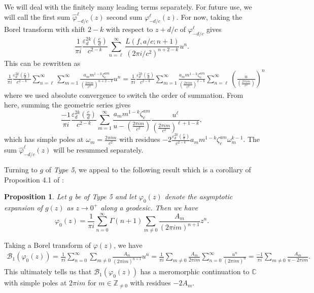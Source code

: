 \documentclass[12pt]{amsart}
\theoremstyle{definition}
\theoremstyle{plain}
\newtheorem{prop}[theorem]{Proposition}
\numberwithin{equation}{section}
\begin{document}
We will deal with the finitely many leading terms separately.  For future use, we will call the first sum $\widehat{\varphi}_{-d/c}^{\ell}(z)$ second sum $\varphi_{-d/c}^\ell(z)$.  For now, taking the Borel transform with shift $2-k$ with respect to $z+d/c$ of $\varphi_{-d/c}^\ell$ gives
\[\frac{1}{\pi i}  \frac{\varepsilon_d^{2k} \left( \frac{c}{d}\right)}{c^{2-k}}\sum_{n=\ell}^\infty \frac{L(f, a/c; n+1)}{(2\pi i /c^2)^{n+2-k}} u^n.
\]
This can be rewritten as 
\begin{align*}
\frac{1}{\pi i}  \frac{\varepsilon_d^{2k} \left( \frac{c}{d}\right) }{c^{2-k}}\sum_{n=\ell}^{\infty} \sum_{m=1}^\infty \frac{a_m m^{1-k}\zeta_c^{am}}{\left(\frac{2\pi i m}{c^2}\right)^{n+2-k}} u^n 
= \frac{1}{\pi i}  \frac{\varepsilon_d^{2k} \left( \frac{c}{d}\right) }{c^{2-k}} \sum_{m=1}^\infty \frac{a_m m^{1-k}\zeta_c^{am}}{\left(\frac{2\pi i m}{c^2}\right)^{2-k}}\sum_{n=\ell}^{\infty}  \left(\frac{u}{\left(\frac{2\pi i m}{c^2}\right)}\right)^n
\end{align*}
where we used absolute convergence to switch the order of summation. 
From here, summing the geometric series gives 
\[\frac{-1}{\pi i}  \frac{\varepsilon_d^{2k} \left( \frac{c}{d}\right) }{c^{2-k}}  \sum_{m=1}^\infty \frac{a_m m^{1-k}\zeta_c^{am} }{u-\left(\frac{2\pi i m}{c^2}\right)}\frac{u^{\ell}}{\left(\frac{2\pi i m}{c^2}\right)^{\ell+1-k}},
\]
which has simple poles at $\omega_m = \frac{2\pi i m}{c^2}$ with residues $-2  \frac{\varepsilon_d^{2k} \left( \frac{c}{d}\right)}{c^{2-k}}  a_m m^{1-k}\zeta_c^{am}\omega_m^{k-1}$. The sum $\widehat{\varphi}_{-d/c}^{\ell}(z)$ will be resummed separately.

Turning to $g$ of \emph{Type 5}, we appeal to 
the following result which is a corollary of Proposition 4.1 of \cite{fantini-rella}:

\begin{prop} \label{prop: maass discont}
	Let $g$ be of Type 5 and let $\varphi_0(z)$ denote the asymptotic expansion of $g(z)$ as $z \to 0^+$ along a geodesic. Then we have
	\[
	\varphi_0(z)= \frac{1}{\pi i}\sum_{n =0}^\infty \Gamma(n+1) \sum_{m \neq 0}\frac{A_m}{(2\pi i m)^{n+1}}z^n.
	\]
\end{prop}
Taking a Borel transform of $\varphi(z)$, we have 
\begin{align*}\mathcal{B}_1(\varphi_0(z))= \frac{1}{\pi i}\sum_{n =0}^\infty  \sum_{m \neq 0}\frac{A_m}{(2\pi i m)^{n+1}}u^n=  \frac{1}{\pi i} \sum_{m \neq 0}\frac{A_m}{2\pi i m} \sum_{n =0}^\infty  \frac{u^n}{(2\pi i m)^{n}}=  \frac{-1}{\pi i} \sum_{m \neq 0} \frac{A_m}{u-2\pi i m}.	\end{align*}
This ultimately tells us that $\mathcal{B}_1(\varphi_0(z))$ has a meromorphic continuation to $\mathbb{C}$ with simple poles at $2\pi i m$ for $m \in \mathbb{Z}_{\neq 0}$ with residues $-2A_m$. 
\end{document}
